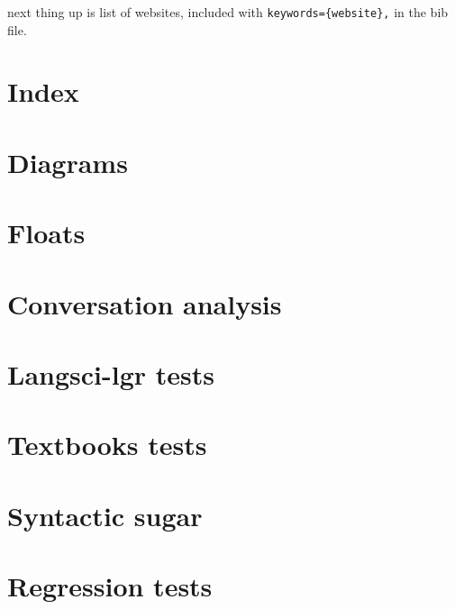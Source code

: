 \documentclass[output=book
  ,colorlinks
  ,showindex
    ,tblseight
  ]{langscibook}
\begin{document}
\printbibliography[keyword={standard},title={Standards}]



next thing up is list of websites, included with \verb+keywords={website},+ in the bib file.

\printbibliography[keyword={website},title={Websites}]



\section{Index}


\section{Diagrams}


\section{Floats}

\section{Conversation analysis}



%
\section{Langsci-lgr tests}


\section{Textbooks tests}


\section{Syntactic sugar}

\section{Regression tests}


\end{document}
